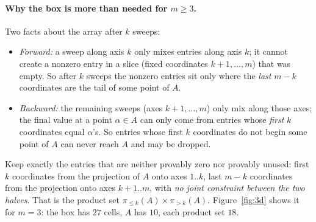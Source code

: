 \documentclass[11pt]{article}
\newcommand{\pr}[1]{\pi_{#1}}
\begin{document}
\paragraph{Why the box is more than needed for $m\ge3$.} Two facts about the array after $k$ sweeps:
\begin{itemize}
\item \emph{Forward:} a sweep along axis $k$ only mixes entries along axis $k$; it cannot create a nonzero entry in a
      slice (fixed coordinates $k{+}1,\dots,m$) that was empty. So after $k$ sweeps the nonzero entries sit only where
      the \emph{last} $m-k$ coordinates are the tail of some point of $A$.
\item \emph{Backward:} the remaining sweeps (axes $k{+}1,\dots,m$) only mix along those axes; the final value at a point
      $\alpha\in A$ can only come from entries whose \emph{first} $k$ coordinates equal $\alpha$'s. So entries whose first
      $k$ coordinates do not begin some point of $A$ can never reach $A$ and may be dropped.
\end{itemize}
Keep exactly the entries that are neither provably zero nor provably unused: first $k$ coordinates from the
projection of $A$ onto axes $1..k$, last $m-k$ coordinates from the projection onto axes $k{+}1..m$, with \emph{no joint
constraint between the two halves}. That is the product set $\pr{\le k}(A)\times\pr{>k}(A)$. Figure~\ref{fig:3d} shows it for
$m=3$: the box has $27$ cells, $A$ has $10$, each product set $18$.
\end{document}
